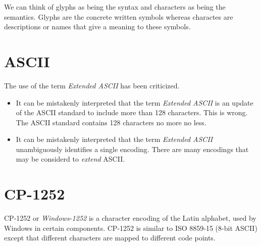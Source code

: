 We can think of glyphs as being the syntax and characters as being the semantics.
Glyphs are the concrete written symbols whereas charactes are descriptions or names 
that give a meaning to these symbols. 

\begin{figure}[h]
\end{figure} 

\frmrule




\section{ASCII}

The use of the term \textit{Extended ASCII} has been criticized. 
\begin{itemize}   
\renewcommand{\labelitemi}{$\Box$}
\item It can be mistakenly interpreted that the term \textit{Extended ASCII} 
is an update of the ASCII standard to include more than 128 characters. 
This is wrong. The ASCII standard 
contains 128 characters no more no less.
\item It can be mistakenly interpreted that the term \textit{Extended ASCII} 
unambiguously identifies a single encoding.
There are many encodings that may be considerd to \textit{extend} ASCII.
\end{itemize}
 

\frmrule


\section{CP-1252}

CP-1252 or \textit{Windows-1252} is a character encoding of the Latin alphabet, 
used by Windows in certain components.
CP-1252 is similar to ISO 8859-15 (8-bit ASCII) except that different characters 
are mapped to different code points. 


